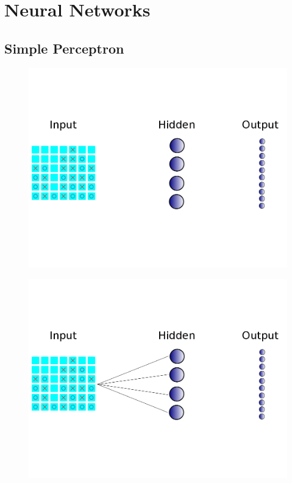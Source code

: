 \section{Neural Networks}
\subsection{Simple Perceptron}

\begin{frame}
\begin{figure}
\includegraphics[width=0.8 \textwidth]{"simple neural net no lines"}
\end{figure}
\end{frame}

\begin{frame}
\begin{figure}
\includegraphics[width=0.8 \textwidth]{"simple neural net half lines"}
\end{figure}
\end{frame}

